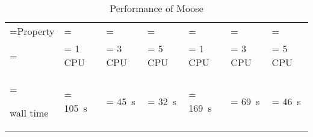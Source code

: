 \begin{table}[htbp]
    \centering
    \caption{Performance of Moose}
    \label{fully-saturated-undrained-compression:moose-performance}
    \begin{tabularx}{\textwidth}{
            >{\hsize\linewidth=\hsize}X
            >{\hsize\linewidth=\hsize\hspace{-5pt}}Y
            >{\hsize\linewidth=\hsize\hspace{-5pt}}Y
            >{\hsize\linewidth=\hsize\hspace{-5pt}}Y
            >{\hsize\linewidth=\hsize\hspace{-5pt}}Y
            >{\hsize\linewidth=\hsize\hspace{-5pt}}Y
            >{\hsize\linewidth=\hsize\hspace{-5pt}}Y}

        \hline

        Property              &    &                                                                                   \\

        {}                    &
        1 CPU                 &
        3 CPU                 &
        5 CPU                 &
        1 CPU                 &
        3 CPU                 &
        5 CPU                                                                                     \\

        \hline

        wall time             & \qty[per-mode = symbol]{105}{\second} & \qty[per-mode =
        symbol]{45}{\second}  & \qty[per-mode = symbol]{32}{\second}  & \qty[per-mode =
        symbol]{169}{\second} & \qty[per-mode = symbol]{69}{\second}  & \qty[per-mode =
        symbol]{46}{\second}                                                                      \\


        \hline
    \end{tabularx}
\end{table}

